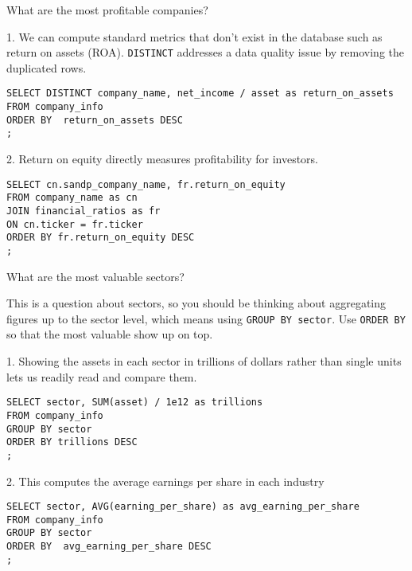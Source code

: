 \documentclass[10pt]{exam}
\begin{document}
\begin{questions}

\question What are the most profitable companies?

\begin{solution}

    1. We can compute standard metrics that don't exist in the database such as return on assets (ROA).
\texttt{DISTINCT} addresses a data quality issue by removing the duplicated
    rows.

\begin{lstlisting}
SELECT DISTINCT company_name, net_income / asset as return_on_assets
FROM company_info
ORDER BY  return_on_assets DESC
;
\end{lstlisting}

2.
Return on equity directly measures profitability for investors.

\begin{lstlisting}
SELECT cn.sandp_company_name, fr.return_on_equity
FROM company_name as cn
JOIN financial_ratios as fr
ON cn.ticker = fr.ticker
ORDER BY fr.return_on_equity DESC
;
\end{lstlisting}

\end{solution}


\question What are the most valuable sectors?

\begin{solution}
    This is a question about sectors, so you should be thinking about
    aggregating figures up to the sector level, which means using \texttt{GROUP
    BY sector}. Use \texttt{ORDER BY} so that the most valuable show up on
    top.

1.    Showing the assets in each sector in trillions of dollars rather than single units lets us
    readily read and compare them.

\begin{lstlisting}
SELECT sector, SUM(asset) / 1e12 as trillions
FROM company_info
GROUP BY sector
ORDER BY trillions DESC
;
\end{lstlisting}

2. This computes the average earnings per share in each industry

\begin{lstlisting}
SELECT sector, AVG(earning_per_share) as avg_earning_per_share
FROM company_info
GROUP BY sector
ORDER BY  avg_earning_per_share DESC
;
\end{lstlisting}


\end{solution}

\end{questions}
\end{document}
